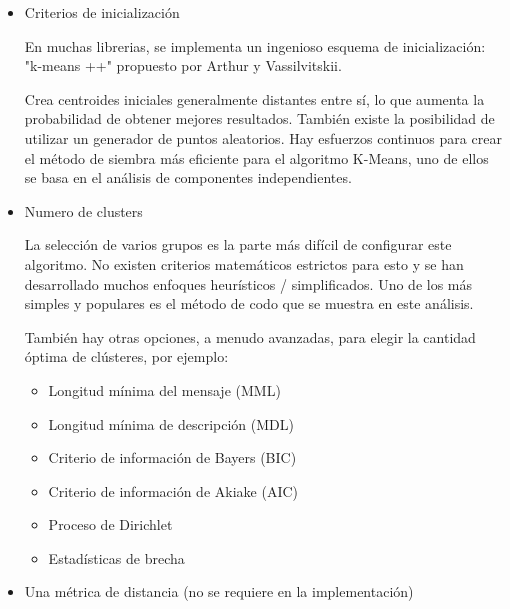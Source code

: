 \documentclass[12pt, fleqn]{report}                             %
\theoremstyle{break}                                            %
\begin{document}
        \begin{itemize}
            \item Criterios de inicialización
            
            En muchas librerias, se implementa un ingenioso esquema de 
            inicialización: "k-means ++" propuesto por Arthur y Vassilvitskii. 
            
            Crea centroides iniciales generalmente distantes entre sí, lo que aumenta la 
            probabilidad de obtener mejores resultados. 
            También existe la posibilidad de utilizar un generador de puntos aleatorios. 
            Hay esfuerzos continuos para crear el método de siembra más eficiente para el algoritmo K-Means,
                uno de ellos se basa en el análisis de componentes independientes.

            \item 
                Numero de clusters

                La selección de varios grupos es la parte más difícil de configurar este algoritmo. 
                No existen criterios matemáticos estrictos para esto y se han desarrollado muchos enfoques heurísticos / simplificados. 
                Uno de los más simples y populares es el método de codo que se muestra en este análisis.
                
                También hay otras opciones, a menudo avanzadas, para elegir la cantidad óptima de clústeres, por ejemplo:
                \begin{itemize}
                    \item Longitud mínima del mensaje (MML)
                    \item Longitud mínima de descripción (MDL)
                    \item Criterio de información de Bayers (BIC)
                    \item Criterio de información de Akiake (AIC)
                    \item Proceso de Dirichlet
                    \item Estadísticas de brecha
                \end{itemize}

            \item Una métrica de distancia (no se requiere en la implementación)
            

\end{itemize}
\end{document}
